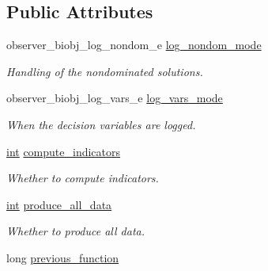 \subsection*{Public Attributes}
\begin{DoxyCompactItemize}
\item 
observer\+\_\+biobj\+\_\+log\+\_\+nondom\+\_\+e \hyperlink{structobserver__biobj__data__t_a677892bdbf95e69eb440114d8010bf77}{log\+\_\+nondom\+\_\+mode}\hypertarget{structobserver__biobj__data__t_a677892bdbf95e69eb440114d8010bf77}{}\label{structobserver__biobj__data__t_a677892bdbf95e69eb440114d8010bf77}

\begin{DoxyCompactList}\small\item\em Handling of the nondominated solutions. \end{DoxyCompactList}\item 
observer\+\_\+biobj\+\_\+log\+\_\+vars\+\_\+e \hyperlink{structobserver__biobj__data__t_a57a9ad34bb9b45d80d91c745ce7e2b73}{log\+\_\+vars\+\_\+mode}\hypertarget{structobserver__biobj__data__t_a57a9ad34bb9b45d80d91c745ce7e2b73}{}\label{structobserver__biobj__data__t_a57a9ad34bb9b45d80d91c745ce7e2b73}

\begin{DoxyCompactList}\small\item\em When the decision variables are logged. \end{DoxyCompactList}\item 
\hyperlink{classint}{int} \hyperlink{structobserver__biobj__data__t_ab9c6cade634a0b49b25fef0ce3540eca}{compute\+\_\+indicators}\hypertarget{structobserver__biobj__data__t_ab9c6cade634a0b49b25fef0ce3540eca}{}\label{structobserver__biobj__data__t_ab9c6cade634a0b49b25fef0ce3540eca}

\begin{DoxyCompactList}\small\item\em Whether to compute indicators. \end{DoxyCompactList}\item 
\hyperlink{classint}{int} \hyperlink{structobserver__biobj__data__t_a90bc6b613109af5f90bca5f0a641fc47}{produce\+\_\+all\+\_\+data}\hypertarget{structobserver__biobj__data__t_a90bc6b613109af5f90bca5f0a641fc47}{}\label{structobserver__biobj__data__t_a90bc6b613109af5f90bca5f0a641fc47}

\begin{DoxyCompactList}\small\item\em Whether to produce all data. \end{DoxyCompactList}\item 
long \hyperlink{structobserver__biobj__data__t_a763c2216ebe74abdcdbe4af2bab11056}{previous\+\_\+function}\hypertarget{structobserver__biobj__data__t_a763c2216ebe74abdcdbe4af2bab11056}{}\label{structobserver__biobj__data__t_a763c2216ebe74abdcdbe4af2bab11056}


\end{DoxyCompactItemize}
